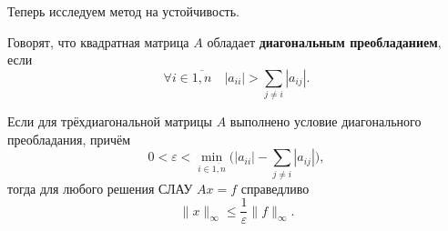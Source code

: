 \documentclass{article}
\begin{document}
Теперь исследуем метод на устойчивость.

\begin{define}\label{eq:diagonally_dominant_matrix}
	Говорят, что квадратная матрица $A$ обладает \textbf{диагональным
	преобладанием}, если
	\[\forall i\in\overline{1,n}\quad |a_{ii}|>\sum_{j\ne i}|a_{ij}|.\]
\end{define}

\begin{theorem}
	Если для трёхдиагональной матрицы $A$ выполнено условие диагонального
	преобладания, причём
	\[0<\varepsilon<\min_{i\in\overline{1,n}}\Big(|a_{ii}|-
	\sum_{j\ne i}|a_{ij}|\Big),\]
	тогда для любого решения СЛАУ $Ax=f$ справедливо
	\[\boxed{\|x\|_\infty\le\frac{1}{\varepsilon}
	\|f\|_\infty}.\]
\end{theorem}
\end{document}
